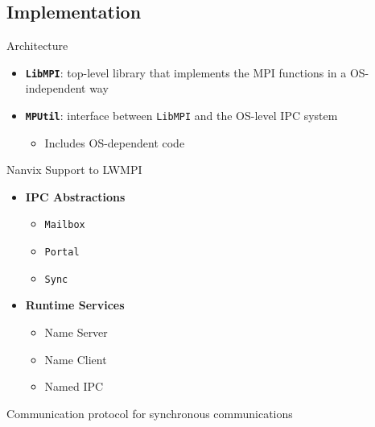 \documentclass[english,aspectratio=169]{lapesd-slides}
\begin{document}
    \subsection{Implementation}
      \begin{frame}{Architecture}

        \begin{itemize}
          \item \texttt{\textbf{LibMPI}}: top-level library that implements the MPI functions in a OS-independent way
          \item \texttt{\textbf{MPUtil}}: interface between \texttt{LibMPI} and the OS-level IPC system
          \begin{itemize}
             \item Includes OS-dependent code 
          \end{itemize}
        \end{itemize}
      \end{frame}

      \begin{frame}{Nanvix Support to LWMPI}
        \begin{itemize}
          \item \textbf{IPC Abstractions}~\cite{Souto2020}
          \begin{itemize}
            \item \texttt{Mailbox}
            \item \texttt{Portal}
            \item \texttt{Sync}
          \end{itemize}
          \bigskip
          \item \textbf{Runtime Services}
          \begin{itemize}
            \item Name Server
            \item Name Client
            \item Named IPC
          \end{itemize}
        \end{itemize}
      \end{frame}

      \begin{frame}{Communication protocol for synchronous communications}
      \end{frame}
\end{document}
